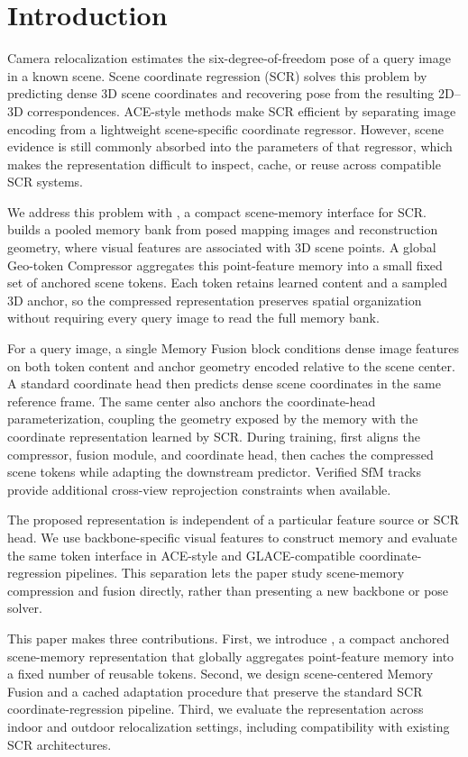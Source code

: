 \section{Introduction}

Camera relocalization estimates the six-degree-of-freedom pose of a query image in a known scene. Scene coordinate regression (SCR) solves this problem by predicting dense 3D scene coordinates and recovering pose from the resulting 2D--3D correspondences. ACE-style methods make SCR efficient by separating image encoding from a lightweight scene-specific coordinate regressor. However, scene evidence is still commonly absorbed into the parameters of that regressor, which makes the representation difficult to inspect, cache, or reuse across compatible SCR systems.

We address this problem with \method{}, a compact scene-memory interface for SCR. \method{} builds a pooled memory bank from posed mapping images and reconstruction geometry, where visual features are associated with 3D scene points. A global Geo-token Compressor aggregates this point-feature memory into a small fixed set of anchored scene tokens. Each token retains learned content and a sampled 3D anchor, so the compressed representation preserves spatial organization without requiring every query image to read the full memory bank.

For a query image, a single Memory Fusion block conditions dense image features on both token content and anchor geometry encoded relative to the scene center. A standard coordinate head then predicts dense scene coordinates in the same reference frame. The same center also anchors the coordinate-head parameterization, coupling the geometry exposed by the memory with the coordinate representation learned by SCR. During training, \method{} first aligns the compressor, fusion module, and coordinate head, then caches the compressed scene tokens while adapting the downstream predictor. Verified SfM tracks provide additional cross-view reprojection constraints when available.

The proposed representation is independent of a particular feature source or SCR head. We use backbone-specific visual features to construct memory and evaluate the same token interface in ACE-style and GLACE-compatible coordinate-regression pipelines. This separation lets the paper study scene-memory compression and fusion directly, rather than presenting a new backbone or pose solver.

This paper makes three contributions. First, we introduce \method{}, a compact anchored scene-memory representation that globally aggregates point-feature memory into a fixed number of reusable tokens. Second, we design scene-centered Memory Fusion and a cached adaptation procedure that preserve the standard SCR coordinate-regression pipeline. Third, we evaluate the representation across indoor and outdoor relocalization settings, including compatibility with existing SCR architectures.
